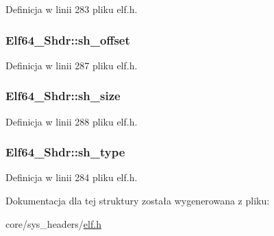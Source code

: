 Definicja w linii 283 pliku elf.\-h.

\hypertarget{struct_elf64___shdr_afd5e899b00b6527bbecf9cd4bda50112}{
\subsubsection[{sh\-\_\-offset}]{ Elf64\-\_\-\-Shdr\-::sh\-\_\-offset}}\label{struct_elf64___shdr_afd5e899b00b6527bbecf9cd4bda50112}


Definicja w linii 287 pliku elf.\-h.

\hypertarget{struct_elf64___shdr_a8988fd6e383835e9d51344eddf38ef24}{
\subsubsection[{sh\-\_\-size}]{ Elf64\-\_\-\-Shdr\-::sh\-\_\-size}}\label{struct_elf64___shdr_a8988fd6e383835e9d51344eddf38ef24}


Definicja w linii 288 pliku elf.\-h.

\hypertarget{struct_elf64___shdr_a6379cd77214969499ae99e6e8a46405c}{
\subsubsection[{sh\-\_\-type}]{ Elf64\-\_\-\-Shdr\-::sh\-\_\-type}}\label{struct_elf64___shdr_a6379cd77214969499ae99e6e8a46405c}


Definicja w linii 284 pliku elf.\-h.



Dokumentacja dla tej struktury została wygenerowana z pliku\-:\begin{DoxyCompactItemize}
\item 
core/sys\-\_\-headers/\hyperlink{elf_8h}{elf.\-h}\end{DoxyCompactItemize}
